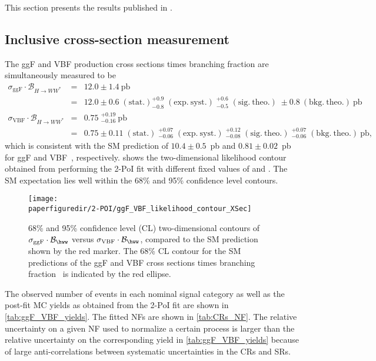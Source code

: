 This section presents the results published in .

\subsection{Inclusive cross-section measurement}
The ggF and VBF production cross sections times branching fraction are simultaneously measured to be
\begin{eqnarray*}
  \sigma_{\mathrm{ggF}} \cdot \mathcal{B}_{H \to WW^{\ast}} &=& 12.0 \pm 1.4~\mathrm{pb} \\
  &=& 12.0 \pm 0.6\;(\mathrm{stat.}) ^{+0.9}_{-0.8}\;(\mathrm{exp.~syst.})\;^{+0.6}_{-0.5}\;(\mathrm{sig.~theo.})\; \pm 0.8~(\mathrm{bkg.~theo.})~\mathrm{pb} \\
  \sigma_{\mathrm{VBF}} \cdot \mathcal{B}_{H \to WW^{\ast}} &=& 0.75\;^{+0.19}_{-0.16}~\mathrm{pb} \\
  &=& 0.75 \pm 0.11\;(\mathrm{stat.})\;^{+0.07}_{-0.06}\;(\mathrm{exp.~syst.})\;^{+0.12}_{-0.08}\;(\mathrm{sig.~theo.})\;^{+0.07}_{-0.06}\;(\mathrm{bkg.~theo.})~\mathrm{pb},
\end{eqnarray*}
which is consistent with the SM prediction of $10.4\pm 0.5$~pb and $0.81\pm 0.02$~pb for ggF and VBF~\cite{deFlorian:2016spz}, respectively.
 shows the two-dimensional likelihood contour obtained from performing the 2-PoI fit with different fixed values of \muGGF and \muVBF. The SM expectation lies well within the 68\% and 95\% confidence level contours.
\begin{figure}[htb]
  \centering
  \texttt{[image: \\paperfiguredir/2-POI/ggF\_VBF\_likelihood\_contour\_XSec]}
  \caption{
    68\% and 95\% confidence level (CL) two-dimensional contours of $\sigma_{\mathrm{ggF}} \cdot \mathcal{B}_{\hww}$ versus \mbox{$\sigma_{\mathrm{VBF}}\cdot\mathcal{B}_{\hww}$}, compared to the SM prediction shown by the red marker.
    The 68\% CL contour for the SM predictions of the ggF and VBF cross sections times branching fraction~\cite{deFlorian:2016spz} is indicated by the red ellipse.
    \label{fig:LL2D}
  }
\end{figure}
The observed number of events in each nominal signal category as well as the post-fit MC yields as obtained from the 2-PoI fit are shown in \cref{tab:ggF_VBF_yields}.
The fitted NFs are shown in \cref{tab:CRs_NF}.
The relative uncertainty on a given NF used to normalize a certain process is larger than the relative uncertainty on the corresponding yield in \cref{tab:ggF_VBF_yields} because of large anti-correlations between systematic uncertainties in the CRs and SRs. 
